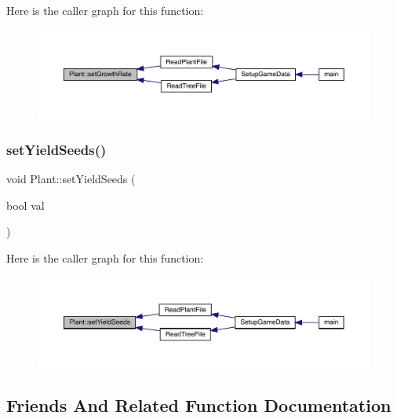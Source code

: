 Here is the caller graph for this function\+:
\nopagebreak
\begin{figure}[H]
\begin{center}
\leavevmode
\includegraphics[width=350pt]{class_plant_af55fc2a9b7b3833ecc305f7fe19fd5dd_icgraph}
\end{center}
\end{figure}
\mbox{\label{class_plant_a21c26df7238a78906804603559f5cc04}} 
\subsubsection{\texorpdfstring{set\+Yield\+Seeds()}{setYieldSeeds()}}
{\footnotesize\ttfamily void Plant\+::set\+Yield\+Seeds (\begin{DoxyParamCaption}\item[{bool}]{val }\end{DoxyParamCaption})}

Here is the caller graph for this function\+:
\nopagebreak
\begin{figure}[H]
\begin{center}
\leavevmode
\includegraphics[width=350pt]{class_plant_a21c26df7238a78906804603559f5cc04_icgraph}
\end{center}
\end{figure}


\subsection{Friends And Related Function Documentation}
\mbox{\label{class_plant_a4b682814d14447120dd184fd300deade}} 
